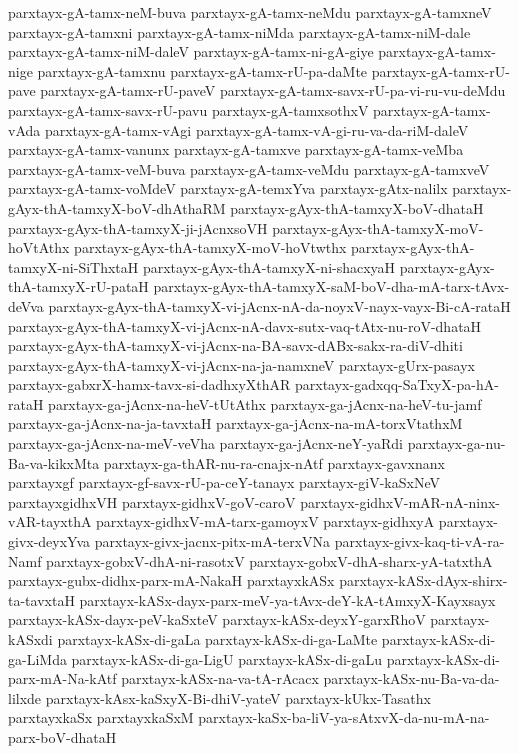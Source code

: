 {parxtayx-gA-tamx-neM-buva
parxtayx-gA-tamx-neMdu
parxtayx-gA-tamxneV
parxtayx-gA-tamxni
parxtayx-gA-tamx-niMda
parxtayx-gA-tamx-niM-dale
parxtayx-gA-tamx-niM-daleV
parxtayx-gA-tamx-ni-gA-giye
parxtayx-gA-tamx-nige
parxtayx-gA-tamxnu
parxtayx-gA-tamx-rU-pa-daMte
parxtayx-gA-tamx-rU-pave
parxtayx-gA-tamx-rU-paveV
parxtayx-gA-tamx-savx-rU-pa-vi-ru-vu-deMdu
parxtayx-gA-tamx-savx-rU-pavu
parxtayx-gA-tamxsothxV
parxtayx-gA-tamx-vAda
parxtayx-gA-tamx-vAgi
parxtayx-gA-tamx-vA-gi-ru-va-da-riM-daleV
parxtayx-gA-tamx-vanunx
parxtayx-gA-tamxve
parxtayx-gA-tamx-veMba
parxtayx-gA-tamx-veM-buva
parxtayx-gA-tamx-veMdu
parxtayx-gA-tamxveV
parxtayx-gA-tamx-voMdeV
parxtayx-gA-temxYva
parxtayx-gAtx-nalilx
parxtayx-gAyx-thA-tamxyX-boV-dhAthaRM
parxtayx-gAyx-thA-tamxyX-boV-dhataH
parxtayx-gAyx-thA-tamxyX-ji-jAcnxsoVH
parxtayx-gAyx-thA-tamxyX-moV-hoVtAthx
parxtayx-gAyx-thA-tamxyX-moV-hoVtwthx
parxtayx-gAyx-thA-tamxyX-ni-SiThxtaH
parxtayx-gAyx-thA-tamxyX-ni-shacxyaH
parxtayx-gAyx-thA-tamxyX-rU-pataH
parxtayx-gAyx-thA-tamxyX-saM-boV-dha-mA-tarx-tAvx-deVva
parxtayx-gAyx-thA-tamxyX-vi-jAcnx-nA-da-noyxV-nayx-vayx-Bi-cA-rataH
parxtayx-gAyx-thA-tamxyX-vi-jAcnx-nA-davx-sutx-vaq-tAtx-nu-roV-dhataH
parxtayx-gAyx-thA-tamxyX-vi-jAcnx-na-BA-savx-dABx-sakx-ra-diV-dhiti
parxtayx-gAyx-thA-tamxyX-vi-jAcnx-na-ja-namxneV
parxtayx-gUrx-pasayx
parxtayx-gabxrX-hamx-tavx-si-dadhxyXthAR
parxtayx-gadxqq-SaTxyX-pa-hA-rataH
parxtayx-ga-jAcnx-na-heV-tUtAthx
parxtayx-ga-jAcnx-na-heV-tu-jamf
parxtayx-ga-jAcnx-na-ja-tavxtaH
parxtayx-ga-jAcnx-na-mA-torxVtathxM
parxtayx-ga-jAcnx-na-meV-veVha
parxtayx-ga-jAcnx-neY-yaRdi
parxtayx-ga-nu-Ba-va-kikxMta
parxtayx-ga-thAR-nu-ra-cnajx-nAtf
parxtayx-gavxnanx
parxtayxgf
parxtayx-gf-savx-rU-pa-ceY-tanayx
parxtayx-giV-kaSxNeV
parxtayxgidhxVH
parxtayx-gidhxV-goV-caroV
parxtayx-gidhxV-mAR-nA-ninx-vAR-tayxthA
parxtayx-gidhxV-mA-tarx-gamoyxV
parxtayx-gidhxyA
parxtayx-givx-deyxYva
parxtayx-givx-jacnx-pitx-mA-terxVNa
parxtayx-givx-kaq-ti-vA-ra-Namf
parxtayx-gobxV-dhA-ni-rasotxV
parxtayx-gobxV-dhA-sharx-yA-tatxthA
parxtayx-gubx-didhx-parx-mA-NakaH
parxtayxkASx
parxtayx-kASx-dAyx-shirx-ta-tavxtaH
parxtayx-kASx-dayx-parx-meV-ya-tAvx-deY-kA-tAmxyX-Kayxsayx
parxtayx-kASx-dayx-peV-kaSxteV
parxtayx-kASx-deyxY-garxRhoV
parxtayx-kASxdi
parxtayx-kASx-di-gaLa
parxtayx-kASx-di-ga-LaMte
parxtayx-kASx-di-ga-LiMda
parxtayx-kASx-di-ga-LigU
parxtayx-kASx-di-gaLu
parxtayx-kASx-di-parx-mA-Na-kAtf
parxtayx-kASx-na-va-tA-rAcacx
parxtayx-kASx-nu-Ba-va-da-lilxde
parxtayx-kAsx-kaSxyX-Bi-dhiV-yateV
parxtayx-kUkx-Tasathx
parxtayxkaSx
parxtayxkaSxM
parxtayx-kaSx-ba-liV-ya-sAtxvX-da-nu-mA-na-parx-boV-dhataH
}
